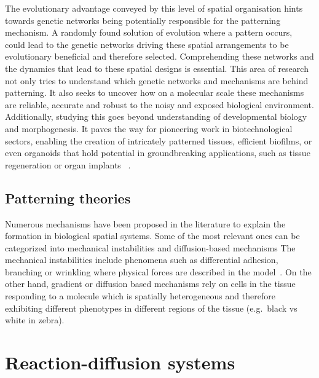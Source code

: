 The evolutionary advantage conveyed by this level of spatial organisation  hints towards genetic networks being potentially responsible for the patterning mechanism.
A randomly found solution of evolution where a pattern occurs, could lead to the genetic networks driving these spatial arrangements to be evolutionary beneficial and therefore selected.
Comprehending these networks and the dynamics that lead to these spatial designs is essential.
This area of research not only tries to understand which genetic networks and mechanisms are behind patterning.
It also seeks to uncover how on a molecular scale these mechanisms are reliable, accurate and robust to the noisy and exposed biological environment.
Additionally, studying this goes beyond understanding of developmental biology and morphogenesis.
It paves the way for pioneering work in biotechnological sectors, enabling the creation of intricately patterned tissues, efficient biofilms, or even organoids that hold potential in groundbreaking applications, such as tissue regeneration or organ implants ~\parencite{Scholes2017,Tan2018}. %



\subsection{Patterning theories}
Numerous mechanisms have been proposed in the literature to explain the formation in biological spatial systems.
Some of the most relevant ones can be categorized into mechanical instabilities and diffusion-based mechanisms %
The mechanical instabilities include phenomena such as differential adhesion, branching or wrinkling where physical forces are described in the model~\parencite{Scholes2017}.
On the other hand, gradient or diffusion based mechanisms rely on cells in the tissue responding to a molecule which is spatially heterogeneous and therefore exhibiting different phenotypes in different regions of the tissue (e.g.\ black vs white in zebra).


\section{Reaction-diffusion systems}

